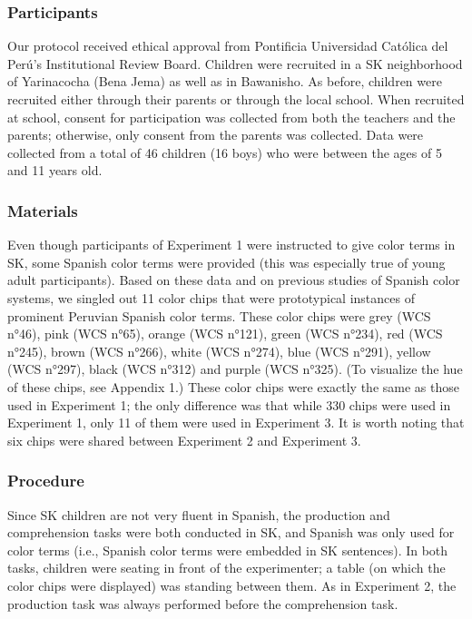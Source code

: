 \documentclass[,man,floatsintext]{apa6}
\theoremstyle{definition}
\theoremstyle{definition}
\theoremstyle{definition}
\theoremstyle{remark}
\begin{document}
\subsubsection{Participants}\label{participants-2}

Our protocol received ethical approval from Pontificia Universidad
Católica del Perú's Institutional Review Board. Children were recruited
in a SK neighborhood of Yarinacocha (Bena Jema) as well as in Bawanisho.
As before, children were recruited either through their parents or
through the local school. When recruited at school, consent for
participation was collected from both the teachers and the parents;
otherwise, only consent from the parents was collected. Data were
collected from a total of 46 children (16 boys) who were between the
ages of 5 and 11 years old.

\subsubsection{Materials}\label{materials-2}

Even though participants of Experiment 1 were instructed to give color
terms in SK, some Spanish color terms were provided (this was especially
true of young adult participants). Based on these data and on previous
studies of Spanish color systems, we singled out 11 color chips that
were prototypical instances of prominent Peruvian Spanish color terms.
These color chips were grey (WCS n°46), pink (WCS n°65), orange (WCS
n°121), green (WCS n°234), red (WCS n°245), brown (WCS n°266), white
(WCS n°274), blue (WCS n°291), yellow (WCS n°297), black (WCS n°312) and
purple (WCS n°325). (To visualize the hue of these chips, see Appendix
1.) These color chips were exactly the same as those used in Experiment
1; the only difference was that while 330 chips were used in Experiment
1, only 11 of them were used in Experiment 3. It is worth noting that
six chips were shared between Experiment 2 and Experiment 3.

\subsubsection{Procedure}\label{procedure-2}

Since SK children are not very fluent in Spanish, the production and
comprehension tasks were both conducted in SK, and Spanish was only used
for color terms (i.e., Spanish color terms were embedded in SK
sentences). In both tasks, children were seating in front of the
experimenter; a table (on which the color chips were displayed) was
standing between them. As in Experiment 2, the production task was
always performed before the comprehension task.
\end{document}
